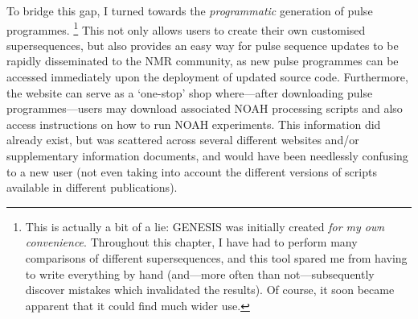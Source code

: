 To bridge this gap, I turned towards the \textit{programmatic} generation of pulse programmes.%
\footnote{This is actually a bit of a lie: GENESIS was initially created \textit{for my own convenience}. Throughout this chapter, I have had to perform many comparisons of different supersequences, and this tool spared me from having to write everything by hand (and---more often than not---subsequently discover mistakes which invalidated the results). Of course, it soon became apparent that it could find much wider use.}
This not only allows users to create their own customised supersequences, but also provides an easy way for pulse sequence updates to be rapidly disseminated to the NMR community, as new pulse programmes can be accessed immediately upon the deployment of updated source code.
Furthermore, the website can serve as a `one-stop' shop where---after downloading pulse programmes---users may download associated NOAH processing scripts and also access instructions on how to run NOAH experiments.
This information did already exist, but was scattered across several different websites and/or supplementary information documents, and would have been needlessly confusing to a new user (not even taking into account the different versions of scripts available in different publications).
